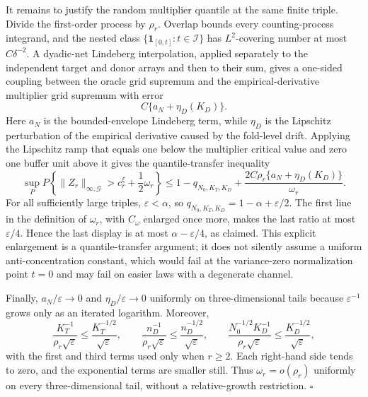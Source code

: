It remains to justify the random multiplier quantile at the same finite triple.  Divide the first-order process by \(\rho_r\).  Overlap bounds every counting-process integrand, and the nested class \(\{\mathbf 1_{[0,t]}:t\in\mathcal I\}\) has \(L^2\)-covering number at most \(C\delta^{-2}\).  A dyadic-net Lindeberg interpolation, applied separately to the independent target and donor arrays and then to their sum, gives a one-sided coupling between the oracle grid supremum and the empirical-derivative multiplier grid supremum with error
\[
 C\{a_N+\eta_D(K_D)\}.
\]
Here \(a_N\) is the bounded-envelope Lindeberg term, while \(\eta_D\) is the Lipschitz perturbation of the empirical derivative caused by the fold-level drift.  Applying the Lipschitz ramp that equals one below the multiplier critical value and zero one buffer unit above it gives the quantile-transfer inequality
\[
 \sup_P P\!\left\{\|Z_r\|_{\infty,\mathcal G}>c_r^\xi+\frac12\omega_r\right\}
 \le 1-q_{N_0,K_T,K_D}
 +\frac{2C\rho_r\{a_N+\eta_D(K_D)\}}{\omega_r}.
\]
For all sufficiently large triples, \(\varepsilon<\alpha\), so \(q_{N_0,K_T,K_D}=1-\alpha+\varepsilon/2\).  The first line in the definition of \(\omega_r\), with \(C_\omega\) enlarged once more, makes the last ratio at most \(\varepsilon/4\).  Hence the last display is at most \(\alpha-\varepsilon/4\), as claimed.  This explicit enlargement is a quantile-transfer argument; it does not silently assume a uniform anti-concentration constant, which would fail at the variance-zero normalization point \(t=0\) and may fail on easier laws with a degenerate channel.

Finally, \(a_N/\varepsilon\to0\) and \(\eta_D/\varepsilon\to0\) uniformly on three-dimensional tails because \(\varepsilon^{-1}\) grows only as an iterated logarithm.  Moreover,
\[
 \frac{K_T^{-1}}{\rho_r\sqrt\varepsilon}\le\frac{K_T^{-1/2}}{\sqrt\varepsilon},\qquad
 \frac{n_D^{-1}}{\rho_r\sqrt\varepsilon}\le\frac{n_D^{-1/2}}{\sqrt\varepsilon},\qquad
 \frac{N_0^{-1/2}K_D^{-1}}{\rho_r\sqrt\varepsilon}\le\frac{K_D^{-1/2}}{\sqrt\varepsilon},
\]
with the first and third terms used only when \(r\ge2\).  Each right-hand side tends to zero, and the exponential terms are smaller still.  Thus \(\omega_r=o(\rho_r)\) uniformly on every three-dimensional tail, without a relative-growth restriction. \(\square\)